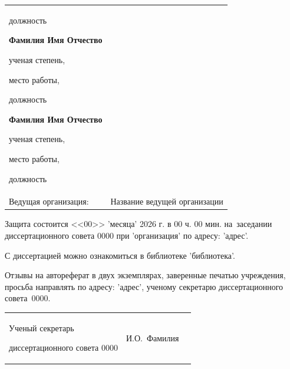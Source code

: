 \documentclass[a4paper,14pt]{extarticle}                     %
\theoremstyle{plain}                                         %
\begin{document}
\begin{tabularx}{\textwidth}{@{}lX@{}}
        должность\par
        \vspace{0.01\paperheight}
        \textbf{Фамилия Имя Отчество}\par
        ученая степень,\par
        место работы,\par
        должность\par
        \vspace{0.01\paperheight}
        \textbf{Фамилия Имя Отчество}\par
        ученая степень,\par
        место работы,\par
        должность\par
    \vspace{0.013\paperheight} \\
    Ведущая организация:    &
        Название ведущей организации
\end{tabularx}
\vspace{0.008\paperheight plus1fill}

\noindent Защита состоится <<00>> 'месяца' 2026 г. в 00 ч. 00 мин. на~заседании диссертационного совета 0000 при 'организация' по адресу: 'адрес'.

\vspace{0.008\paperheight plus1fill}
\noindent С диссертацией можно ознакомиться в библиотеке 'библиотека'.

\vspace{0.008\paperheight plus1fill}
\noindent Отзывы на автореферат в двух экземплярах, заверенные печатью учреждения, просьба направлять по адресу: 'адрес', ученому секретарю диссертационного совета~0000.

\vspace{0.008\paperheight plus1fill}

\vspace{0.008\paperheight plus1fill}
\noindent%
\begin{tabularx}{\textwidth}{@{}%
>{\raggedright\arraybackslash}b{28em}@{}
>{\centering\arraybackslash}X
r
@{}}
    Ученый секретарь\par
    диссертационного совета 0000
    &
    И.О.~Фамилия
\end{tabularx}

\end{document}
